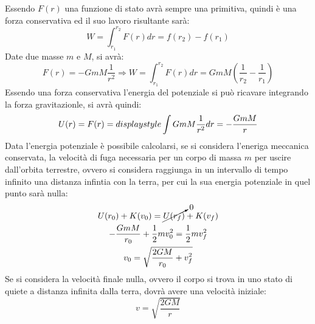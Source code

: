 \documentclass{article}
\numberwithin{equation}{subsection}
\begin{document}
Essendo $F(r)$ una funzione di stato avrà sempre una primitiva, quindi è una forza conservativa ed il suo lavoro risultante sarà:
\begin{equation}
    W=\displaystyle\int_{r_1}^{r_2}F(r)dr=f(r_2)-f(r_1)
\end{equation}
Date due masse $m$ e $M$, si avrà: 
\begin{equation}
    F(r)=-GmM\displaystyle\frac{1}{r^2}\Rightarrow W=\displaystyle\int_{r_1}^{r_2}F(r)dr=GmM\left(\frac{1}{r_2}-\frac{1}{r_1}\right)
\end{equation}
Essendo una forza conservativa l'energia del potenziale si può ricavare integrando la forza gravitazionle, si avrà quindi:
\begin{equation}
    U(r)=\-F(r)=displaystyle\int GmM\frac{1}{r^2}dr=-\frac{GmM}{r}
\end{equation}
Data l'energia potenziale è possibile  calcolarsi, se si considera l'eneriga meccanica conservata, la velocità di fuga necessaria per un corpo di 
massa $m$ per uscire dall'orbita terrestre, ovvero si considera raggiunga in un intervallo di tempo infinito una distanza infintia con la terra, per 
cui la sua energia potenziale in quel punto sarà nulla:
\begin{gather}
    U(r_0)+K(v_0)=\cancelto{0}{U(r_f)}+K(v_f)\\
    -\displaystyle\frac{GmM}{r_0}+\frac{1}{2}mv_0^2=\frac{1}{2}mv_f^2\\
    v_0=\displaystyle\sqrt{\displaystyle\frac{2GM}{r_0}+v_f^2}
\end{gather}
Se si considera la velocità finale nulla, ovvero il corpo si trova in uno stato di quiete a distanza infinita dalla terra, dovrà avere 
una velocità iniziale:
\begin{equation}
    v=\displaystyle\sqrt{\frac{2GM}{r}}
\end{equation}
\end{document}
